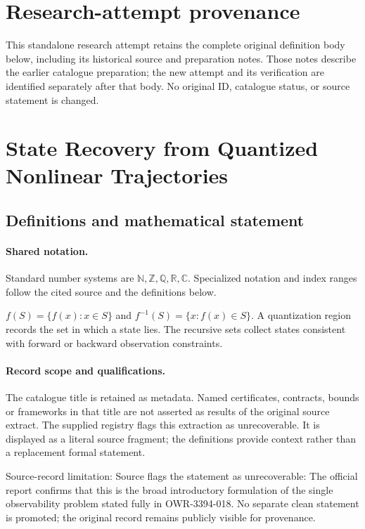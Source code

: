 \documentclass[11pt]{article}
\begin{document}
\section*{Research-attempt provenance}
This standalone research attempt retains the complete original definition body below,
including its historical source and preparation notes. Those notes describe the
earlier catalogue preparation; the new attempt and its verification are identified
separately after that body. No original ID, catalogue status, or source statement is changed.

\section{State Recovery from Quantized Nonlinear Trajectories}\label{statement}

\subsection{Definitions and mathematical statement}

\paragraph{Shared notation.}Standard number systems are $\mathbb N,\mathbb Z,\mathbb Q,\mathbb R,\mathbb C$. Specialized notation and index ranges follow the cited source and the definitions below.


$f(S)=\{f(x):x\in S\}$ and $f^{-1}(S)=\{x:f(x)\in S\}$. A quantization region records the set in which a state lies. The recursive sets collect states consistent with forward or backward observation constraints.
\paragraph{Record scope and qualifications.}
The catalogue title is retained as metadata. Named certificates, contracts, bounds or frameworks in that title are not asserted as results of the original source extract.
The supplied registry flags this extraction as unrecoverable. It is displayed as a literal source fragment; the definitions provide context rather than a replacement formal statement.

Source-record limitation: Source flags the statement as unrecoverable: The official report confirms that this is the broad introductory formulation of the single observability problem stated fully in OWR-3394-018. No separate clean statement is promoted; the original record remains publicly visible for provenance.
\end{document}
